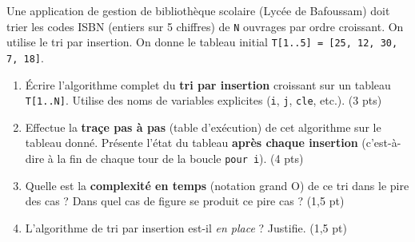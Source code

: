 \documentclass[11pt]{article}
\begin{document}
\begin{exercice}
Une application de gestion de bibliothèque scolaire (Lycée de Bafoussam) doit trier les codes ISBN (entiers sur 5 chiffres) de \texttt{N} ouvrages par ordre croissant. On utilise le tri par insertion.
On donne le tableau initial \texttt{T[1..5] = [25, 12, 30, 7, 18]}.

\begin{enumerate}
    \item Écrire l'algorithme complet du \textbf{tri par insertion} croissant sur un tableau \texttt{T[1..N]}. Utilise des noms de variables explicites (\texttt{i}, \texttt{j}, \texttt{cle}, etc.). \hfill (3 pts)
    \item Effectue la \textbf{traçe pas à pas} (table d'exécution) de cet algorithme sur le tableau donné.
    Présente l'état du tableau \textbf{après chaque insertion} (c'est-à-dire à la fin de chaque tour de la boucle \texttt{pour i}). \hfill (4 pts)
    \item Quelle est la \textbf{complexité en temps} (notation grand O) de ce tri dans le pire des cas ? Dans quel cas de figure se produit ce pire cas ? \hfill (1,5 pt)
    \item L'algorithme de tri par insertion est-il \emph{en place} ? Justifie. \hfill (1,5 pt)
\end{enumerate}
\end{exercice}
\end{document}
